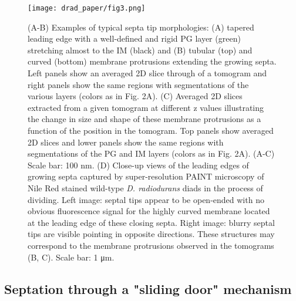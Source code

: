 \begin{figure}
    \centering
    \texttt{[image: drad\_paper/fig3.png]}
    \label{drad_fig3}
\end{figure}
\begin{figure}
    \ContinuedFloat
    \caption[]{(A-B) Examples of typical septa tip morphologies: (A) tapered leading edge with a well-defined and rigid PG layer (green) stretching almost to the IM (black) and (B) tubular (top) and curved (bottom) membrane protrusions extending the growing septa. Left panels show an averaged 2D slice through of a tomogram and right panels show the same regions with segmentations of the various layers (colors as in Fig. 2A). (C) Averaged 2D slices extracted from a given tomogram at different z values illustrating the change in size and shape of these membrane protrusions as a function of the position in the tomogram. Top panels show averaged 2D slices and lower panels show the same regions with segmentations of the PG and IM layers (colors as in Fig. 2A). (A-C) Scale bar: 100 nm. (D) Close-up views of the leading edges of growing septa captured by super-resolution PAINT microscopy of Nile Red stained wild-type \textit{D. radiodurans} diads in the process of dividing. Left image: septal tips appear to be open-ended with no obvious fluorescence signal for the highly curved membrane located at the leading edge of these closing septa. Right image: blurry septal tips are visible pointing in opposite directions. These structures may correspond to the membrane protrusions observed in the tomograms (B, C). Scale bar: 1 μm.}
\end{figure}

\FloatBarrier

\subsection{Septation through a "sliding door" mechanism}

